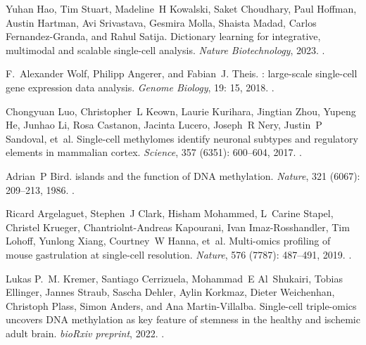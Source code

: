 \documentclass[10pt]{article}
\begin{document}
\begin{thebibliography}{31}
	Yuhan Hao, Tim Stuart, Madeline~H Kowalski, Saket Choudhary, Paul Hoffman,
	Austin Hartman, Avi Srivastava, Gesmira Molla, Shaista Madad, Carlos
	Fernandez-Granda, and Rahul Satija.
	\newblock Dictionary learning for integrative, multimodal and scalable
	single-cell analysis.
	\newblock \emph{Nature Biotechnology}, 2023.
	\newblock {}.
	
	F.~Alexander Wolf, Philipp Angerer, and Fabian~J. Theis.
	: large-scale single-cell gene expression data analysis.
	\newblock \emph{Genome Biology}, 19: 15, 2018.
	\newblock {}.
	
	Chongyuan Luo, Christopher~L Keown, Laurie Kurihara, Jingtian Zhou, Yupeng He,
	Junhao Li, Rosa Castanon, Jacinta Lucero, Joseph~R Nery, Justin~P Sandoval,
	et~al.
	\newblock Single-cell methylomes identify neuronal subtypes and regulatory
	elements in mammalian cortex.
	\newblock \emph{Science}, 357 (6351): 600--604, 2017.
	\newblock {}.
	
	Adrian~P Bird.
	 islands and the function of {DNA} methylation.
	\newblock \emph{Nature}, 321 (6067): 209--213, 1986.
	\newblock {}.
	
	Ricard Argelaguet, Stephen~J Clark, Hisham Mohammed, L~Carine Stapel, Christel
	Krueger, Chantriolnt-Andreas Kapourani, Ivan Imaz-Rosshandler, Tim Lohoff,
	Yunlong Xiang, Courtney~W Hanna, et~al.
	\newblock Multi-omics profiling of mouse gastrulation at single-cell
	resolution.
	\newblock \emph{Nature}, 576 (7787): 487--491, 2019.
	\newblock {}.
	
	Lukas P.~M. Kremer, Santiago Cerrizuela, Mohammad~E Al~Shukairi, Tobias
	Ellinger, Jannes Straub, Sascha Dehler, Aylin Korkmaz, Dieter Weichenhan,
	Christoph Plass, Simon Anders, and Ana Martin-Villalba.
	\newblock Single-cell triple-omics uncovers {DNA} methylation as key feature of
	stemness in the healthy and ischemic adult brain.
	\newblock \emph{bioRxiv preprint}, 2022.
	\newblock {}.
	

\end{thebibliography}
\end{document}
